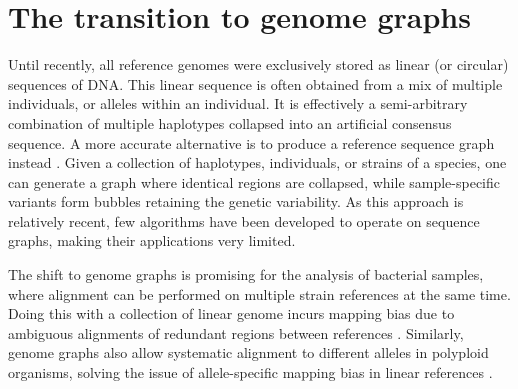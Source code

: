 \section{The transition to genome graphs}

Until recently, all reference genomes were exclusively stored as linear (or circular) sequences of DNA. This linear sequence is often obtained from a mix of multiple individuals, or alleles within an individual. It is effectively a semi-arbitrary combination of multiple haplotypes collapsed into an artificial consensus sequence. A more accurate alternative is to produce a reference sequence graph instead \cite{churchExtendingReferenceAssembly2015}. Given a collection of haplotypes, individuals, or strains of a species, one can generate a graph where identical regions are collapsed, while sample-specific variants form bubbles retaining the genetic variability. As this approach is relatively recent, few algorithms have been developed to operate on sequence graphs, making their applications very limited.

The shift to genome graphs is promising for the analysis of bacterial samples, where alignment can be performed on multiple strain references at the same time. Doing this with a collection of linear genome incurs mapping bias due to ambiguous alignments of redundant regions between references \cite{liDesignConstructionReference2020}. Similarly, genome graphs also allow systematic alignment to different alleles in polyploid organisms, solving the issue of allele-specific mapping bias in linear references \cite{vandegeijnWASPAllelespecificSoftware2015}. 
